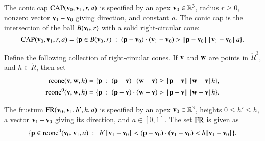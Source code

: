 %


\begin{definition}
The conic cap ${\operatorname{CAP}}({\mathbf v}_0,{\mathbf v}_1,r,a)$ is specified by an apex
${\mathbf v}_0\in\mathbb{R}^3$,  radius $r\ge0$,  nonzero vector ${\mathbf v}_1-{\mathbf v}_0$ giving
direction, and constant $a$.  The conic cap is the intersection of
the ball $B({\mathbf v}_0,r)$ with a solid right-circular cone:
\[ 
\op{CAP}(\v_0,\v_1,r,a)=\{\p \in B(\v_0,r) 
\mid (\p-\v_0)\cdot (\v_1-\v_0) > \norm{\p}{\v_0}\, \norm{\v_1}{\v_0}\, a\}.
\] 
%
%
%
%
\end{definition}

%

\begin{definition}[rcone]\label{def:p:rcone}
%
Define the following collection of right-circular cones.
If ${\mathbf v}$ and ${\mathbf w}$ are points in $\ring{R}^3$, and
$h\in\ring{R}$, then set
\begin{align*}
\op{rcone}(\v,\w,h) 
&= \{\p\mid (\p-\v)\cdot (\w-\v) \ge \norm{\p}{\v}\,\norm{\w}{\v} h\},\\
\op{rcone}^0(\v,\w,h) 
&= \{\p\mid (\p-\v)\cdot (\w-\v) > \norm{\p}{\v}\,\norm{\w}{\v} h\}.\\
\end{align*}
\end{definition}
%
%
%
%


\begin{definition}[frustum, FR]
 The frustum
${\operatorname{FR}}({\mathbf v}_0,{\mathbf v}_1,h',h,a)$ is specified by an apex
${\mathbf v}_0\in\mathbb{R}^3$, heights $0\le h'\le h$, a vector ${\mathbf v}_1-{\mathbf v}_0$
giving its direction, and $a\in[0,1]$. The set ${\operatorname{FR}}$ is given as
\[ 
\{ \p \in\op{rcone}^0(\v_0,\v_1,a) \mid \ 
h'\norm{\v_1}{\v_0} < (\p-\v_0) \cdot (\v_1-\v_0) < h\norm{\v_1}{\v_0} \}.
\] 
%
%
%
\end{definition}

